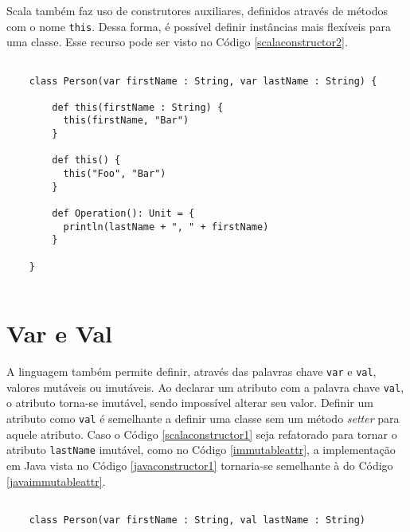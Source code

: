Scala também faz uso de construtores auxiliares, definidos 
através de métodos com o nome \texttt{this}\cite{wampler2021}. 
Dessa forma, é possível 
definir instâncias mais flexíveis para uma classe. Esse 
recurso pode ser visto no Código \ref{scalaconstructor2}.

\begin{lstlisting}[caption={Construtor Auxiliar em Scala.},label=scalaconstructor2]

    class Person(var firstName : String, var lastName : String) {
       
        def this(firstName : String) {
          this(firstName, "Bar")
        }
    
        def this() {
          this("Foo", "Bar")
        }
      
        def Operation(): Unit = {
          println(lastName + ", " + firstName)
        }
  
    }
  
\end{lstlisting}



\section{Var e Val}

A linguagem também permite definir, através das 
palavras chave \texttt{var} e \texttt{val}, valores 
mutáveis ou imutáveis. Ao declarar um atributo com 
a palavra chave \texttt{val}, o atributo torna-se imutável, 
sendo impossível alterar seu valor.\cite{wampler2021, ordesky2008} 
Definir um atributo 
como \texttt{val} é semelhante a definir uma classe sem um 
método \textit{setter} para aquele atributo. Caso 
o Código \ref{scalaconstructor1} seja refatorado 
para tornar o atributo \texttt{lastName} imutável, como no Código 
\ref{immutableattr}, a implementação em Java vista no 
Código \ref{javaconstructor1} tornaria-se semelhante à do Código 
\ref{javaimmutableattr}.

\begin{lstlisting}[caption={Exemplo de Atributo Imutável.},label=immutableattr]

    class Person(var firstName : String, val lastName : String)

\end{lstlisting}

